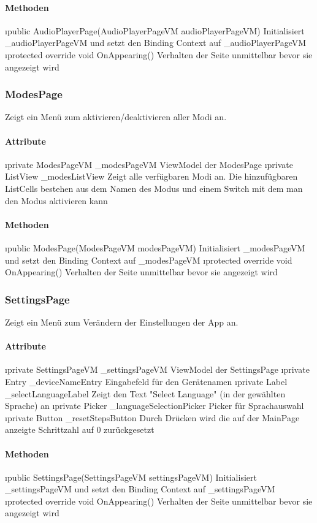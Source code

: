\documentclass[../entwurf.tex]{subfiles}
\begin{document}
\paragraph{Methoden}

\begin{itemize}
	\i{public AudioPlayerPage(AudioPlayerPageVM audioPlayerPageVM)} Initialisiert \_audioPlayerPageVM und setzt den Binding Context 			auf \_audioPlayerPageVM
	\i{protected override void OnAppearing()} Verhalten der Seite unmittelbar bevor sie angezeigt wird
\end{itemize}

\subsubsection{ModesPage}
Zeigt ein Menü zum aktivieren/deaktivieren aller Modi an.
\paragraph{Attribute}
\begin{itemize}
	\i{private ModesPageVM \_modesPageVM} ViewModel der ModesPage
	\i{private ListView \_modesListView} Zeigt alle verfügbaren Modi an. Die hinzufügbaren ListCells bestehen aus dem Namen des Modus und einem Switch mit dem man den Modus aktivieren kann
\end{itemize}

\paragraph{Methoden}

\begin{itemize}
	\i{public ModesPage(ModesPageVM modesPageVM)} Initialisiert \_modesPageVM und setzt den Binding Context 			auf \_modesPageVM
	\i{protected override void OnAppearing()} Verhalten der Seite unmittelbar bevor sie angezeigt wird
\end{itemize}

\subsubsection{SettingsPage}
Zeigt ein Menü zum Verändern der Einstellungen der App an.
\paragraph{Attribute}

\begin{itemize}
	\i{private SettingsPageVM \_settingsPageVM} ViewModel der SettingsPage
	\i{private Entry \_deviceNameEntry} Eingabefeld für den Gerätenamen
	\i{private Label \_selectLanguageLabel} Zeigt den Text "Select Language" (in der gewählten Sprache) an
	\i{private Picker \_languageSelectionPicker} Picker für Sprachauswahl
	\i{private Button \_resetStepsButton} Durch Drücken wird die auf der MainPage anzeigte Schrittzahl auf 0 zurückgesetzt
\end{itemize}

\paragraph{Methoden}

\begin{itemize}
	\i{public SettingsPage(SettingsPageVM settingsPageVM)} Initialisiert \_settingsPageVM und setzt den Binding Context 			auf \_settingsPageVM
	\i{protected override void OnAppearing()} Verhalten der Seite unmittelbar bevor sie angezeigt wird
\end{itemize}
\end{document}
